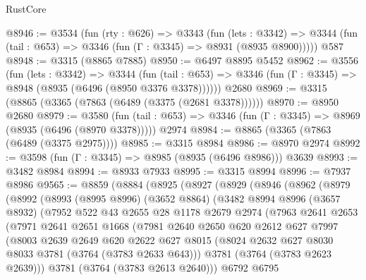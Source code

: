 \begin{lexlean}{RustCore}
\begin{coremodule}
@8946 := @3534
    (fun (rty : @626) =>
    @3343
      (fun (lets : @3342) =>
      @3344 (fun (tail : @653) => @3346 (fun (Γ : @3345) => @8931 (@8935 @8900)))))
    @587
@8948 := @3315 (@8865 @7885)
@8950 := @6497 @8895 @5452
@8962 := @3556
    (fun (lets : @3342) =>
    @3344
      (fun (tail : @653) => @3346 (fun (Γ : @3345) => @8948 (@8935 (@6496 (@8950 @3376 @3378))))))
    @2680
@8969 := @3315 (@8865 (@3365 (@7863 (@6489 (@3375 (@2681 @3378))))))
@8970 := @8950 @2680
@8979 := @3580
    (fun (tail : @653) => @3346 (fun (Γ : @3345) => @8969 (@8935 (@6496 (@8970 @3378)))))
    @2974
@8984 := @8865 (@3365 (@7863 (@6489 (@3375 @2975))))
@8985 := @3315 @8984
@8986 := @8970 @2974
@8992 := @3598 (fun (Γ : @3345) => @8985 (@8935 (@6496 @8986))) @3639
@8993 := @3482 @8984
@8994 := @8933 @7933
@8995 := @3315 @8994
@8996 := @7937 @8986
@9565 := @8859
    (@8884
      (@8925
        (@8927
          (@8929
            (@8946
              (@8962
                (@8979
                  (@8992
                    (@8993
                      (@8995 @8996)
                      (@3652 @8864)
                      (@3482
                        @8994
                        @8996
                        (@3657 @8932)
                        (@7952
                          @522
                          @43
                          @2655
                          @28
                          @1178
                          @2679
                          @2974
                          (@7963
                            @2641
                            @2653
                            (@7971
                              @2641
                              @2651
                              @1668
                              (@7981
                                @2640
                                @2650
                                @620
                                @2612
                                @627
                                @7997
                                (@8003
                                  @2639
                                  @2649
                                  @620
                                  @2622
                                  @627
                                  @8015
                                  (@8024 @2632 @627 @8030 @8033 @3781 (@3764 (@3783 @2633 @643)))
                                  @3781
                                  (@3764 (@3783 @2623 @2639)))
                                @3781
                                (@3764 (@3783 @2613 @2640)))
                              @6792
                              @6795

\end{coremodule}
\end{lexlean}
